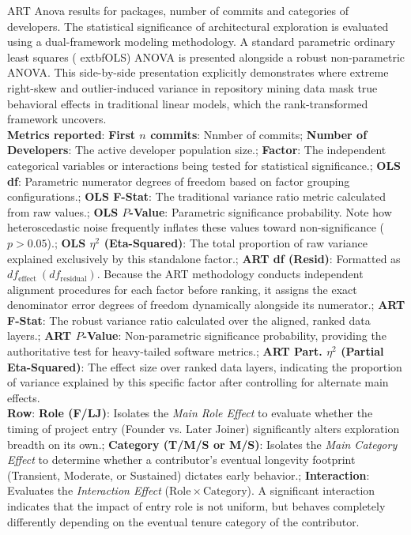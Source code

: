 \begin{landscape}
\begin{table}[H]
\centering
\setlength{\tabcolsep}{2pt}
\caption[ART Anova for all packages]{ART Anova results for packages, number of commits and categories of developers. The statistical significance of architectural exploration is evaluated using a dual-framework modeling methodology. A standard parametric ordinary least squares (	extbf{OLS}) ANOVA is presented alongside a robust non-parametric ANOVA. This side-by-side presentation explicitly demonstrates where extreme right-skew and outlier-induced variance in repository mining data mask true behavioral effects in traditional linear models, which the rank-transformed framework uncovers.\\ \textbf{Metrics reported}:   \textbf{First $n$ commits}: Nnmber of commits;  \textbf{Number of Developers}: The active developer population size.;  \textbf{Factor}: The independent categorical variables or interactions being tested for statistical significance.;  \textbf{OLS df}: Parametric numerator degrees of freedom based on factor grouping configurations.;  \textbf{OLS F-Stat}: The traditional variance ratio metric calculated from raw values.;  \textbf{OLS $P$-Value}: Parametric significance probability. Note how heteroscedastic noise frequently inflates these values toward non-significance ($p > 0.05$).;  \textbf{OLS $\eta^2$ (Eta-Squared)}: The total proportion of raw variance explained exclusively by this standalone factor.;  \textbf{ART df (Resid)}: Formatted as $df_{\mathrm{effect}}~(df_{\mathrm{residual}})$. Because the ART methodology conducts independent alignment procedures for each factor before ranking, it assigns the exact denominator error degrees of freedom dynamically alongside its numerator.;  \textbf{ART F-Stat}: The robust variance ratio calculated over the aligned, ranked data layers.;  \textbf{ART $P$-Value}: Non-parametric significance probability, providing the authoritative test for heavy-tailed software metrics.;  \textbf{ART Part. $\eta^2$ (Partial Eta-Squared)}: The effect size over ranked data layers, indicating the proportion of variance explained by this specific factor after controlling for alternate main effects.
\\ \textbf{Row}:   \textbf{Role (F/LJ)}: Isolates the \textit{Main Role Effect} to evaluate whether the timing of project entry (Founder vs. Later Joiner) significantly alters exploration breadth on its own.;  \textbf{Category (T/M/S or M/S)}: Isolates the \textit{Main Category Effect} to determine whether a contributor's eventual longevity footprint (Transient, Moderate, or Sustained) dictates early behavior.;  \textbf{Interaction}: Evaluates the \textit{Interaction Effect} ($\mathrm{Role} \times \mathrm{Category}$). A significant interaction indicates that the impact of entry role is not uniform, but behaves completely differently depending on the eventual tenure category of the contributor.
}
\end{table}
\end{landscape}

